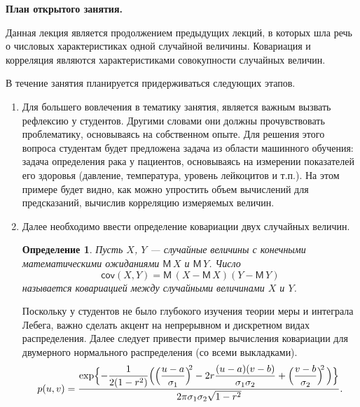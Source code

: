 \documentclass[14pt]{extarticle}
\newcommand{\M}{{\mathsf M}\,}
\newcommand{\cov}{\mathsf{cov}}
\theoremstyle{theorem}
\newtheorem{definition}{Определение}
\theoremstyle{remark}
\begin{document}
  \medskip
  \medskip
  \medskip
\textbf{План открытого занятия.}

Данная лекция является продолжением предыдущих лекций, в которых шла речь о числовых характеристиках одной случайной величины. Ковариация и корреляция являются характеристиками совокупности случайных величин.

В течение занятия планируется придерживаться следующих этапов.
\begin{enumerate}
    \item Для большего вовлечения в тематику занятия, является важным вызвать рефлексию у студентов. Другими словами они должны прочувствовать проблематику, основываясь на собственном опыте. Для решения этого вопроса студентам будет предложена задача из области машинного обучения: задача определения рака у пациентов, основываясь на измерении показателей его здоровья (давление, температура, уровень лейкоцитов и т.п.). На этом примере будет видно, как можно упростить объем вычислений для предсказаний, вычислив корреляцию измеряемых величин.
    \item Далее необходимо ввести определение ковариации двух случайных величин. 
        \begin{definition}
  Пусть $X$, $Y$ --- случайные величины с конечными математическими ожиданиями $\M X$ и
  $\M Y$. Число 
  \[
  \cov(X,Y)=\M(X-\M X)(Y-\M Y)
  \]
  называется \emph{ковариацией} между случайными величинами $X$ и $Y$.
\end{definition}
Поскольку у студентов не было глубокого изучения теории меры и интеграла Лебега, важно сделать акцент на непрерывном и дискретном видах распределения. Далее следует привести пример вычисления ковариации для двумерного нормального распределения (со всеми выкладками).
\[
p(u,v)=\dfrac{\exp\Bigl\{-\dfrac{1}{2(1-r^2)}\Bigl(
\Bigl(\dfrac{u-a}{\sigma_1}\Bigr)^{\!\!2}-2r\dfrac{(u-a)(v-b)}{\sigma_1\sigma_2}
+ \Bigl(\dfrac{v-b}{\sigma_2}\Bigr)^{\!\!2}\,\Bigr)\Bigr\}}{2\pi\sigma_1\sigma_2\sqrt{1-r^2}}%
.
\]
    

\end{enumerate}
\end{document}
